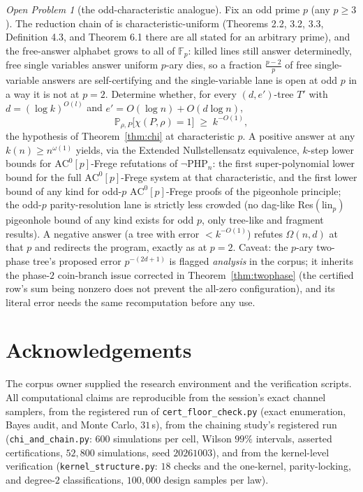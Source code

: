 \documentclass[11pt]{article}
\theoremstyle{definition}
\theoremstyle{remark}
\newtheorem{openproblem}{Open Problem}
\newcommand{\F}{\mathbb{F}}
\newcommand{\PHPn}{\neg\mathrm{PHP}_n}
\newcommand{\Prob}{\mathbb{P}}
\newcommand{\AC}{\mathrm{AC}}
\begin{document}
\begin{openproblem}[the odd-characteristic analogue]\label{op:oddprime}
Fix an odd prime $p$ (any $p\ge3$).  The reduction chain of
\cite{Kra26} is characteristic-uniform (Theorems 2.2, 3.2, 3.3,
Definition 4.3, and Theorem 6.1 there are all stated for an arbitrary
prime), and the free-answer alphabet grows to all of $\F_p$: killed
lines still answer determinedly, free single variables answer uniform
$p$-ary dies, so a fraction $\frac{p-2}{p}$ of free single-variable
answers are self-certifying and the single-variable lane is open at
odd $p$ in a way it is not at $p=2$.  Determine whether, for every
$(d,e')$-tree $T'$ with $d=(\log k)^{O(l)}$ and
$e'=O(\log n)+O(d\log n)$,
\[
\Prob_{\rho,P}\bigl[\chi(P,\rho)=1\bigr]\;\ge\;k^{-O(1)},
\]
the hypothesis of Theorem~\ref{thm:chi} at characteristic $p$.  A
positive answer at any $k(n)\ge n^{\omega(1)}$ yields, via the
Extended Nullstellensatz equivalence, $k$-step lower bounds for
$\AC^0[p]$-Frege refutations of $\PHPn$: the first super-polynomial
lower bound for the full $\AC^0[p]$-Frege system at that
characteristic, and the first lower bound of any kind for odd-$p$
$\AC^0[p]$-Frege proofs of the pigeonhole principle; the odd-$p$
parity-resolution lane is strictly less crowded (no dag-like
Res$(\mathrm{lin}_p)$ pigeonhole bound of any kind exists for odd
$p$, only tree-like and fragment results).  A negative answer (a tree
with error $<k^{-O(1)}$) refutes $\Omega(n,d)$ at that $p$ and
redirects the program, exactly as at $p=2$.  Caveat: the $p$-ary
two-phase tree's proposed error $p^{-(2d+1)}$ is flagged
\emph{analysis} in the corpus; it inherits the phase-$2$ coin-branch
issue corrected in Theorem~\ref{thm:twophase} (the certified row's
sum being nonzero does not prevent the all-zero configuration), and
its literal error needs the same recomputation before any use.
\end{openproblem}

\section*{Acknowledgements}
The corpus owner supplied the research environment and the verification
scripts.  All computational claims are reproducible from the session's
exact channel samplers, from the registered run of
\texttt{cert\_floor\_check.py} (exact enumeration, Bayes audit, and
Monte Carlo, $31$\,s), from the chaining study's registered run
(\texttt{chi\_and\_chain.py}: $600$ simulations per cell, Wilson
$99\%$ intervals, asserted certifications, $52{,}800$ simulations,
seed $20261003$), and from the kernel-level verification
(\texttt{kernel\_structure.py}: $18$ checks and the one-kernel,
parity-locking, and degree-$2$ classifications, $100{,}000$ design
samples per law).
\end{document}
